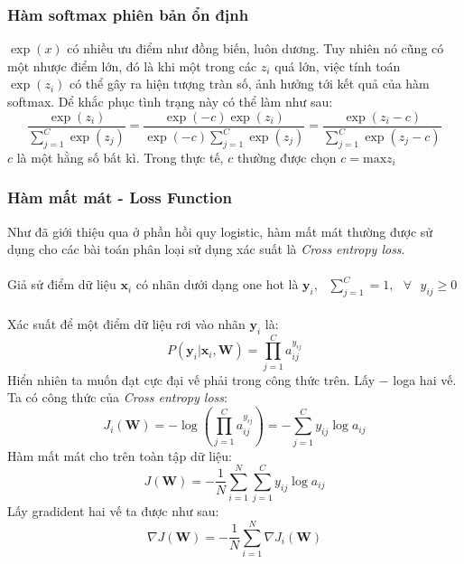 \documentclass{article}
\begin{document}
\subsubsection*{Hàm softmax phiên bản ổn định}
$\exp(x)$ có nhiều ưu điểm như đồng biến, luôn dương. Tuy nhiên nó cũng có một nhược điểm lớn, đó là khi một trong các $z_i$ quá lớn, việc tính toán $\exp(z_i)$ có thể gây ra hiện tượng tràn số, ảnh hưởng tới kết quả của hàm softmax. Dể khắc phục tình trạng này có thể làm như sau:
\begin{equation}
    \frac{\exp(z_i)}{\sum_{j=1}^{C}\exp(z_j)}=\frac{\exp(-c)\exp(z_i)}{\exp(-c)\sum_{j=1}^{C}\exp(z_j)} = \frac{\exp(z_i-c)}{\sum_{j=1}^{C}\exp(z_j-c)}
    \label{eq25}
\end{equation}
$c$ là một hằng số bất kì. Trong thực tế, $c$ thường được chọn $c = \text{max} z_i$
\subsubsection*{Hàm mất mát - Loss Function}
Như đã giới thiệu qua ở phần hồi quy logistic, hàm mất mát thường được sử dụng cho các bài toán phân loại sử dụng xác suất là \textit{Cross entropy loss}.\\\\
Giả sử điểm dữ liệu $\textbf{x}_i$ có nhãn dưới dạng one hot là $\textbf{y}_i,\text{ } \sum_{j=1}^{C}=1, \text{ } \forall\text{ }  y_{ij} \geq 0$\\\\
Xác suất để một điểm dữ liệu rơi vào nhãn $\textbf{y}_i$ là:
\begin{equation}
    P(\textbf{y}_i|\textbf{x}_i,\textbf{W}) = \prod_{j=1}^{C}a_{ij}^{y_{ij}}
    \label{eq26}
\end{equation}
Hiển nhiên ta muốn đạt cực đại vế phải trong công thức trên. Lấy $-$ loga hai vế. Ta có công thức của \textit{Cross entropy loss}:
\begin{equation}
    J_i(\textbf{W}) = -\log(\prod_{j=1}^{C}a_{ij}^{y_{ij}}) = -\sum_{j=1}^{C}y_{ij}\log{a_{ij}}
    \label{eq27}
\end{equation}
Hàm mất mát cho trên toàn tập dữ liệu:
\begin{equation}
    J(\textbf{W}) = -\frac{1}{N}\sum_{i=1}^{N}\sum_{j=1}^{C}y_{ij}\log{a_{ij}}
    \label{eq28}
\end{equation}
Lấy gradident hai vế ta được như sau:
\begin{equation}
    \nabla J(\textbf{W}) = -\frac{1}{N}\sum_{i=1}^{N}\nabla J_i(\textbf{W})
\end{equation}
\end{document}
